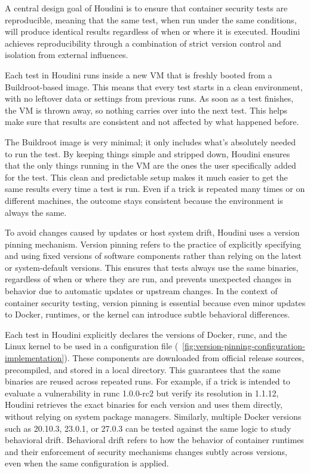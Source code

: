 \documentclass[12pt]{report}
\begin{document}
\begin{doublespace}
A central design goal of Houdini is to ensure that container security tests are reproducible, meaning that the same test, when run under the same conditions, will produce identical results regardless of when or where it is executed. Houdini achieves reproducibility through a combination of strict version control and isolation from external influences.

Each test in Houdini runs inside a new VM that is freshly booted from a Buildroot-based image. This means that every test starts in a clean environment, with no leftover data or settings from previous runs. As soon as a test finishes, the VM is thrown away, so nothing carries over into the next test. This helps make sure that results are consistent and not affected by what happened before.

The Buildroot image is very minimal; it only includes what's absolutely needed to run the test. By keeping things simple and stripped down, Houdini ensures that the only things running in the VM are the ones the user specifically added for the test. This clean and predictable setup makes it much easier to get the same results every time a test is run. Even if a trick is repeated many times or on different machines, the outcome stays consistent because the environment is always the same.

To avoid changes caused by updates or host system drift, Houdini uses a version pinning mechanism. Version pinning refers to the practice of explicitly specifying and using fixed versions of software components rather than relying on the latest or system-default versions. This ensures that tests always use the same binaries, regardless of when or where they are run, and prevents unexpected changes in behavior due to automatic updates or upstream changes. In the context of container security testing, version pinning is essential because even minor updates to Docker, runtimes, or the kernel can introduce subtle behavioral differences.

Each test in Houdini explicitly declares the versions of Docker, runc, and the Linux kernel to be used in a configuration file (~\ref{fig:version-pinning-configuration-implementation}). These components are downloaded from official release sources, precompiled, and stored in a local directory. This guarantees that the same binaries are reused across repeated runs. For example, if a trick is intended to evaluate a vulnerability in runc 1.0.0-rc2 but verify its resolution in 1.1.12, Houdini retrieves the exact binaries for each version and uses them directly, without relying on system package managers. Similarly, multiple Docker versions such as 20.10.3, 23.0.1, or 27.0.3 can be tested against the same logic to study behavioral drift. Behavioral drift refers to how the behavior of container runtimes and their enforcement of security mechanisms changes subtly across versions, even when the same configuration is applied.



\end{doublespace}
\end{document}
